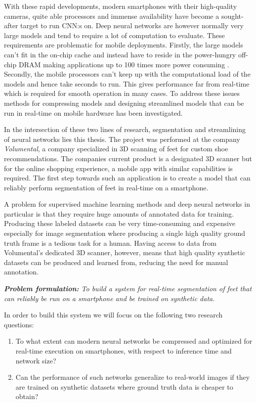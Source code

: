 \documentclass{kththesis}
\begin{document}
With these rapid developments, modern smartphones with their high-quality
cameras, quite able processors and immense availability have become a sought-after target to run CNN:s on. Deep neural networks are however normally very
large models and tend to require a lot of computation to evaluate. These
requirements are problematic for mobile deployments. Firstly, the large
models can't fit in the on-chip cache and instead have to reside in the power-hungry off-chip DRAM making applications up to 100 times more power consuming
\parencite{han2015learning}. Secondly, the mobile processors can't keep up with
the computational load of the models and hence take seconds to run. This gives
performance far from real-time which is required for smooth operation in many
cases. To address these issues methods for compressing models and designing
streamlined models that can be run in real-time on mobile hardware has been
investigated.

In the intersection of these two lines of research, segmentation and
streamlining of neural networks lies this thesis. The project was performed at
the company \textit{Volumental}, a company specialized in 3D scanning of feet
for custom shoe recommendations. The companies current product is a designated
3D scanner but for the online shopping experience, a mobile app with similar
capabilities is required. The first step towards such an application is to create
a model that can reliably perform segmentation of feet in real-time on a
smartphone.

A problem for supervised machine learning methods and deep neural networks in
particular is that they require huge amounts of annotated data for training.
Producing these labeled datasets can be very time-consuming and expensive
especially for image segmentation where producing a single high quality
ground truth frame is a tedious task for a human. Having access to data from
Volumental's dedicated 3D scanner, however, means that high quality synthetic
datasets can be produced and learned from, reducing the need for manual annotation.

\textit{\textbf{Problem formulation:} To build a system for real-time segmentation of feet that can reliably be run on a
  smartphone and be trained on synthetic data.}

\noindent In order to build this system we will focus on the following two research questions:
\begin{enumerate}
\item To what extent can modern neural networks be compressed and optimized for
  real-time execution on smartphones, with respect to inference time and
  network size?
\item Can the performance of such networks generalize to real-world images if
  they are trained on synthetic datasets where ground truth data is cheaper to
  obtain?
\end{enumerate}
\end{document}
